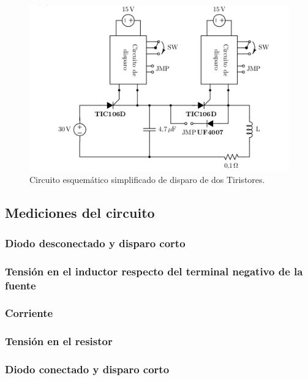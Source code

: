 \documentclass[a4paper,10pt]{article}
\begin{document}
\begin{figure}[H] %
\begin{center}
\includegraphics[scale=0.5]{./imagenes/Circuito_Tiristores.png}
\caption{Circuito esquemático simplificado de disparo de dos Tiristores. }
 \label{fig:Circuito_tiristores}
\end{center}
\end{figure}

\subsection{Mediciones del circuito}

\subsubsection{Diodo desconectado y disparo corto}

\subsubsection*{Tensión en el inductor respecto del terminal negativo de la fuente}
\subsubsection*{Corriente}
\subsubsection*{Tensión en el resistor}

\subsubsection{Diodo conectado y disparo corto}
\end{document}
